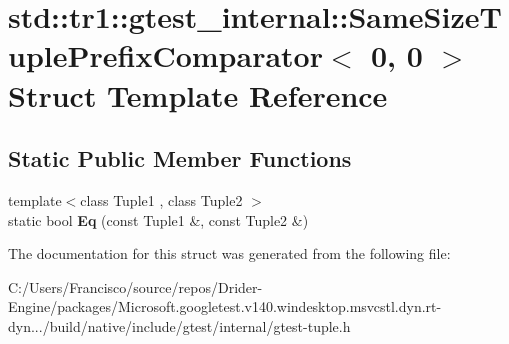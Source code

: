 \hypertarget{structstd_1_1tr1_1_1gtest__internal_1_1_same_size_tuple_prefix_comparator_3_010_00_010_01_4}{}\section{std\+:\+:tr1\+:\+:gtest\+\_\+internal\+:\+:Same\+Size\+Tuple\+Prefix\+Comparator$<$ 0, 0 $>$ Struct Template Reference}
\label{structstd_1_1tr1_1_1gtest__internal_1_1_same_size_tuple_prefix_comparator_3_010_00_010_01_4}
\subsection*{Static Public Member Functions}
\begin{DoxyCompactItemize}
\item 
\mbox{\label{structstd_1_1tr1_1_1gtest__internal_1_1_same_size_tuple_prefix_comparator_3_010_00_010_01_4_a4f209822266c6bb1832c49750a11ef95}} 
{\footnotesize template$<$class Tuple1 , class Tuple2 $>$ }\\static bool {\bfseries Eq} (const Tuple1 \&, const Tuple2 \&)
\end{DoxyCompactItemize}


The documentation for this struct was generated from the following file\+:\begin{DoxyCompactItemize}
\item 
C\+:/\+Users/\+Francisco/source/repos/\+Drider-\/\+Engine/packages/\+Microsoft.\+googletest.\+v140.\+windesktop.\+msvcstl.\+dyn.\+rt-\/dyn.../build/native/include/gtest/internal/gtest-\/tuple.\+h\end{DoxyCompactItemize}
